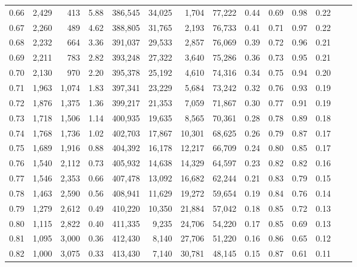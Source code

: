 \begin{tabular}{rrrrrrrrrrrrrr}
0.66 &  2,429 &    413 &     5.88 &  386,545 &   34,025 &   1,704 &  77,222 &  0.44 &  0.69 &  0.98 &      0.22 \\
0.67 &  2,260 &    489 &     4.62 &  388,805 &   31,765 &   2,193 &  76,733 &  0.41 &  0.71 &  0.97 &      0.22 \\
0.68 &  2,232 &    664 &     3.36 &  391,037 &   29,533 &   2,857 &  76,069 &  0.39 &  0.72 &  0.96 &      0.21 \\
0.69 &  2,211 &    783 &     2.82 &  393,248 &   27,322 &   3,640 &  75,286 &  0.36 &  0.73 &  0.95 &      0.21 \\
0.70 &  2,130 &    970 &     2.20 &  395,378 &   25,192 &   4,610 &  74,316 &  0.34 &  0.75 &  0.94 &      0.20 \\
0.71 &  1,963 &  1,074 &     1.83 &  397,341 &   23,229 &   5,684 &  73,242 &  0.32 &  0.76 &  0.93 &      0.19 \\
0.72 &  1,876 &  1,375 &     1.36 &  399,217 &   21,353 &   7,059 &  71,867 &  0.30 &  0.77 &  0.91 &      0.19 \\
0.73 &  1,718 &  1,506 &     1.14 &  400,935 &   19,635 &   8,565 &  70,361 &  0.28 &  0.78 &  0.89 &      0.18 \\
0.74 &  1,768 &  1,736 &     1.02 &  402,703 &   17,867 &  10,301 &  68,625 &  0.26 &  0.79 &  0.87 &      0.17 \\
0.75 &  1,689 &  1,916 &     0.88 &  404,392 &   16,178 &  12,217 &  66,709 &  0.24 &  0.80 &  0.85 &      0.17 \\
0.76 &  1,540 &  2,112 &     0.73 &  405,932 &   14,638 &  14,329 &  64,597 &  0.23 &  0.82 &  0.82 &      0.16 \\
0.77 &  1,546 &  2,353 &     0.66 &  407,478 &   13,092 &  16,682 &  62,244 &  0.21 &  0.83 &  0.79 &      0.15 \\
0.78 &  1,463 &  2,590 &     0.56 &  408,941 &   11,629 &  19,272 &  59,654 &  0.19 &  0.84 &  0.76 &      0.14 \\
0.79 &  1,279 &  2,612 &     0.49 &  410,220 &   10,350 &  21,884 &  57,042 &  0.18 &  0.85 &  0.72 &      0.13 \\
0.80 &  1,115 &  2,822 &     0.40 &  411,335 &    9,235 &  24,706 &  54,220 &  0.17 &  0.85 &  0.69 &      0.13 \\
0.81 &  1,095 &  3,000 &     0.36 &  412,430 &    8,140 &  27,706 &  51,220 &  0.16 &  0.86 &  0.65 &      0.12 \\
0.82 &  1,000 &  3,075 &     0.33 &  413,430 &    7,140 &  30,781 &  48,145 &  0.15 &  0.87 &  0.61 &      0.11 \\

\end{tabular}
